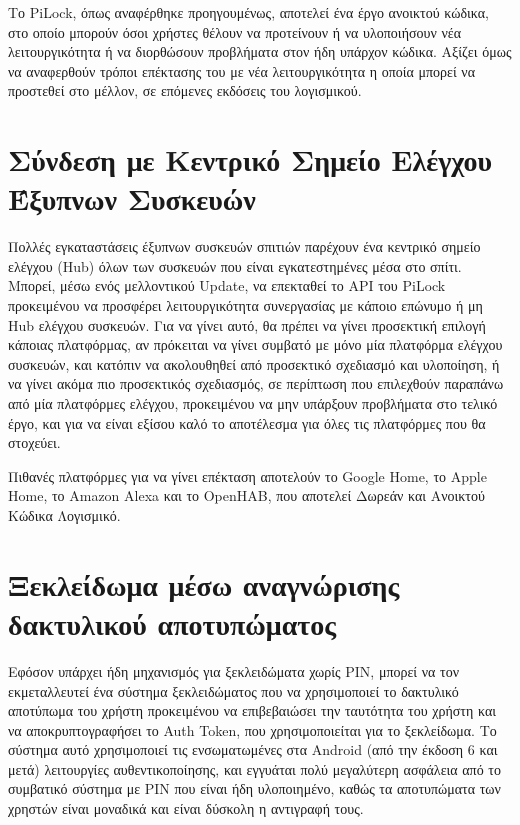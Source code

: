 Το PiLock, όπως αναφέρθηκε προηγουμένως, αποτελεί ένα έργο ανοικτού κώδικα, στο οποίο μπορούν όσοι χρήστες θέλουν να προτείνουν ή να υλοποιήσουν νέα λειτουργικότητα ή να διορθώσουν προβλήματα στον ήδη υπάρχον κώδικα. Αξίζει όμως να αναφερθούν τρόποι επέκτασης του με νέα λειτουργικότητα η οποία μπορεί να προστεθεί στο μέλλον, σε επόμενες εκδόσεις του λογισμικού.

\section{Σύνδεση με Κεντρικό Σημείο Ελέγχου Έξυπνων Συσκευών}
	Πολλές εγκαταστάσεις έξυπνων συσκευών σπιτιών παρέχουν ένα κεντρικό σημείο ελέγχου (Hub) όλων των συσκευών που είναι εγκατεστημένες μέσα στο σπίτι. Μπορεί, μέσω ενός μελλοντικού Update, να επεκταθεί το API του PiLock προκειμένου να προσφέρει λειτουργικότητα συνεργασίας με κάποιο επώνυμο ή μη Hub ελέγχου συσκευών. Για να γίνει αυτό, θα πρέπει να γίνει προσεκτική επιλογή κάποιας πλατφόρμας, αν πρόκειται να γίνει συμβατό με μόνο μία πλατφόρμα ελέγχου συσκευών, και κατόπιν να ακολουθηθεί από προσεκτικό σχεδιασμό και υλοποίηση, ή να γίνει ακόμα πιο προσεκτικός σχεδιασμός, σε περίπτωση που επιλεχθούν παραπάνω από μία πλατφόρμες ελέγχου, προκειμένου να μην υπάρξουν προβλήματα στο τελικό έργο, και για να είναι εξίσου καλό το αποτέλεσμα για όλες τις πλατφόρμες που θα στοχεύει.

	Πιθανές πλατφόρμες για να γίνει επέκταση αποτελούν το Google Home, το Apple Home, το Amazon Alexa και το OpenHAB, που αποτελεί Δωρεάν και Ανοικτού Κώδικα Λογισμικό.

\section{Ξεκλείδωμα μέσω αναγνώρισης δακτυλικού αποτυπώματος}
	Εφόσον υπάρχει ήδη μηχανισμός για ξεκλειδώματα χωρίς PIN, μπορεί να τον εκμεταλλευτεί ένα σύστημα ξεκλειδώματος που να χρησιμοποιεί το δακτυλικό αποτύπωμα του χρήστη προκειμένου να επιβεβαιώσει την ταυτότητα του χρήστη και να αποκρυπτογραφήσει το Auth Token, που χρησιμοποιείται για το ξεκλείδωμα. Το σύστημα αυτό χρησιμοποιεί τις ενσωματωμένες στα Android (από την έκδοση 6 και μετά) λειτουργίες αυθεντικοποίησης, και εγγυάται πολύ μεγαλύτερη ασφάλεια από το συμβατικό σύστημα με PIN που είναι ήδη υλοποιημένο, καθώς τα αποτυπώματα των χρηστών είναι μοναδικά και είναι δύσκολη η αντιγραφή τους.